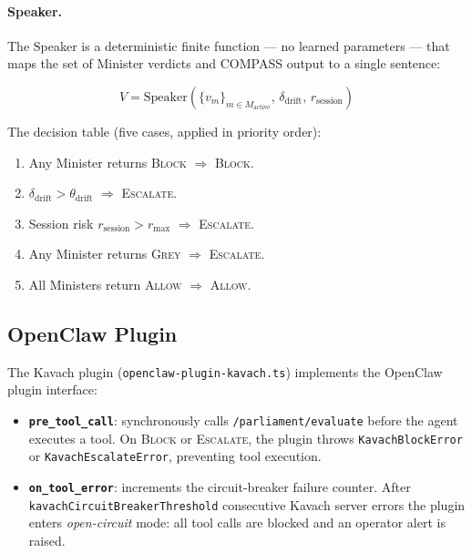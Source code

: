 \paragraph{Speaker.}
The Speaker is a deterministic finite function — no learned parameters — that
maps the set of Minister verdicts and COMPASS output to a single sentence:

\begin{equation}
V = \text{Speaker}(\{v_m\}_{m \in M_{\text{active}}},\, \delta_{\text{drift}},\, r_{\text{session}})
\end{equation}

The decision table (five cases, applied in priority order):
\begin{enumerate}
  \item Any Minister returns \textsc{Block} $\Rightarrow$ \textsc{Block}.
  \item $\delta_{\text{drift}} > \theta_{\text{drift}}$ $\Rightarrow$ \textsc{Escalate}.
  \item Session risk $r_{\text{session}} > r_{\text{max}}$ $\Rightarrow$ \textsc{Escalate}.
  \item Any Minister returns \textsc{Grey} $\Rightarrow$ \textsc{Escalate}.
  \item All Ministers return \textsc{Allow} $\Rightarrow$ \textsc{Allow}.
\end{enumerate}

\subsection{OpenClaw Plugin}
\label{sec:plugin}

The Kavach plugin (\texttt{openclaw-plugin-kavach.ts}) implements the
OpenClaw plugin interface:

\begin{itemize}
  \item \textbf{\texttt{pre\_tool\_call}}: synchronously calls
        \texttt{/parliament/evaluate} before the agent executes a tool.
        On \textsc{Block} or \textsc{Escalate}, the plugin throws
        \texttt{KavachBlockError} or \texttt{KavachEscalateError}, preventing
        tool execution.
  \item \textbf{\texttt{on\_tool\_error}}: increments the circuit-breaker
        failure counter. After \texttt{kavachCircuitBreakerThreshold}
        consecutive Kavach server errors the plugin enters \emph{open-circuit}
        mode: all tool calls are blocked and an operator alert is raised.
\end{itemize}

